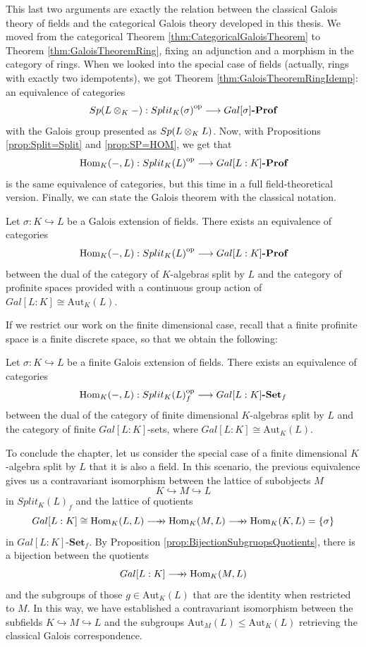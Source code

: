 This last two arguments are exactly the relation between the classical Galois theory of fields and the categorical Galois theory developed in this thesis. We moved from the categorical Theorem \ref{thm:CategoricalGaloisTheorem} to Theorem \ref{thm:GaloisTheoremRing}, fixing an adjunction and a morphism in the category of rings. When we looked into the special case of fields (actually, rings with exactly two idempotents), we got Theorem \ref{thm:GaloisTheoremRingIdemp}: an equivalence of categories
\[ Sp(L\otimes_{K}-):{Split_K(\sigma)}^{\mathrm{op}}\longrightarrow Gal[\sigma]\textbf{-Prof} \]
with the Galois group presented as $Sp(L\otimes_{K}L)$. Now, with Propositions \ref{prop:Split=Split} and \ref{prop:SP=HOM}, we get that
\[ \text{Hom}_K(-,L):{Split_K(L)}^{\mathrm{op}}\longrightarrow Gal[L:K]\textbf{-Prof} \]
is the same equivalence of categories, but this time in a full field-theoretical version. Finally, we can state the Galois theorem with the classical notation.
\begin{theorem}
    Let $\sigma:K\hookrightarrow L$ be a Galois extension of fields. There exists an equivalence of categories
    \[ \text{Hom}_K(-, L):{Split_K(L)}^{\mathrm{op}} \longrightarrow Gal[L:K]\textbf{-Prof} \]
    between the dual of the category of $K$-algebras split by $L$ and the category of profinite spaces provided with a continuous group action of $Gal[L:K]\cong \text{Aut}_K(L)$.
\end{theorem}

If we restrict our work on the finite dimensional case, recall that a finite profinite space is a finite discrete space, so that we obtain the following:
\begin{theorem}
    Let $\sigma:K\hookrightarrow L$ be a finite Galois extension of fields. There exists an equivalence of categories
    \[ \text{Hom}_K(-, L):{Split_K(L)}^{\mathrm{op}}_f \longrightarrow Gal[L:K]\textbf{-Set}_f \]
    between the dual of the category of finite dimensional $K$-algebras split by $L$ and the category of finite $Gal[L:K]$-sets, where $Gal[L:K]\cong \text{Aut}_K(L)$.
\end{theorem}

To conclude the chapter, let us consider the special case of a finite dimensional $K$-algebra split by $L$ that it is also a field. In this scenario, the previous equivalence gives us a contravariant isomorphism between the lattice of subobjects $M$
\[ K\hookrightarrow M\hookrightarrow L \]
in $Split_K(L)_f$ and the lattice of quotients
\[ Gal[L:K]\cong \text{Hom}_K(L,L)\longrrightarrow \text{Hom}_K(M,L) \longrrightarrow \text{Hom}_K(K,L) = \{\sigma\} \]
in $Gal[L:K]\textbf{-Set}_f$. By Proposition \ref{prop:BijectionSubgruopsQuotients}, there is a bijection between the quotients
\[ Gal[L:K]\longrrightarrow \text{Hom}_K(M,L) \]
and the subgroups of those $g\in\text{Aut}_K(L)$ that are the identity when restricted to $M$. In this way, we have established a contravariant isomorphism between the subfields $K\hookrightarrow M\hookrightarrow L$ and the subgroups $\text{Aut}_M(L)\leq \text{Aut}_K(L)$ retrieving the classical Galois correspondence.

